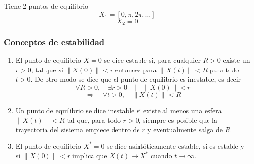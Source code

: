 Tiene 2 puntos de equilibrio
\[
  X_1=[0,\pi,2\pi,\ldots]
\]
\[
  X_2=0
\]

\subsubsection{Conceptos de estabilidad}

\begin{enumerate}
  \item[\textcolor{moradotrayectoria}{1.}] El punto de equilibrio $X=0$ se
    dice estable si, para cualquier
    $R>0$ existe un $r>0$, tal que si $\lVert X(0)\rVert<r$ entonces para
    $\lVert X(t)\rVert<R$ para todo $t>0$. De otro modo se dice que el punto de
    equilibrio es inestable, es decir
    \[
      \forall R>0,\quad \exists r>0
      \quad\big|\quad \lVert X(0)\rVert<r
    \]
    \[
      \Rightarrow\quad \forall t>0,\quad \lVert X(t)\rVert<R
    \]

  \item[\textcolor{rojotrayectoria}{2.}] Un punto de equilibrio se dice
    inestable si existe al menos una esfera
    $\lVert X(t)\rVert<R$ tal que, para todo $r>0$, siempre es posible que la
    trayectoria del sistema empiece dentro de $r$ y eventualmente salga de $R$.

  \item[\textcolor{azultrayectoria}{3.}] El punto de equilibrio $X^{*}=0$ se
    dice asintóticamente estable, si es
    estable y si $\lVert X(0)\rVert<r$ implica que $X(t)\to X^{*}$ cuando
    $t\to\infty$.
\end{enumerate}

